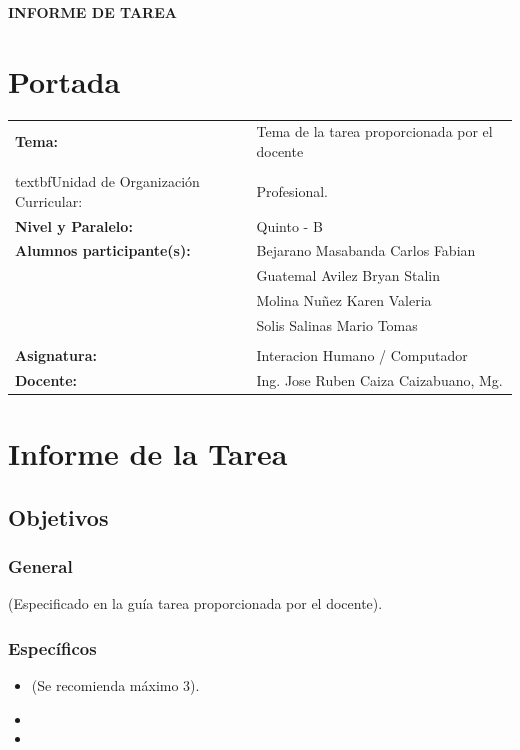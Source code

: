 \documentclass{article}
\begin{document}
\begin{center}
    {\large \textbf{INFORME DE TAREA}} \\    
\end{center}

\section{Portada}
\begin{flushleft}
\begin{tabular}{ l l }
    \textbf{Tema:} & Tema de la tarea proporcionada por el docente \\
    \\textbf{Unidad de Organización Curricular:} & Profesional. \\
    \textbf{Nivel y Paralelo:} & Quinto - B \\
    \textbf{Alumnos participante(s):} & Bejarano Masabanda Carlos Fabian\\
    & Guatemal Avilez Bryan Stalin \\
    & Molina Nuñez Karen Valeria\\
    & Solis Salinas Mario Tomas\\
    & \dotfill \\
    \textbf{Asignatura:} & Interacion Humano / Computador \\
    \textbf{Docente:} & Ing. Jose Ruben Caiza Caizabuano, Mg. \\
\end{tabular}
\end{flushleft}


\section{Informe de la Tarea}
\subsection{Objetivos}
\subsubsection{General}
(Especificado en la guía tarea proporcionada por el docente).
\subsubsection{Específicos}
\begin{itemize}
    \item (Se recomienda máximo 3).
    \item 
    \item 
\end{itemize}
\end{document}
